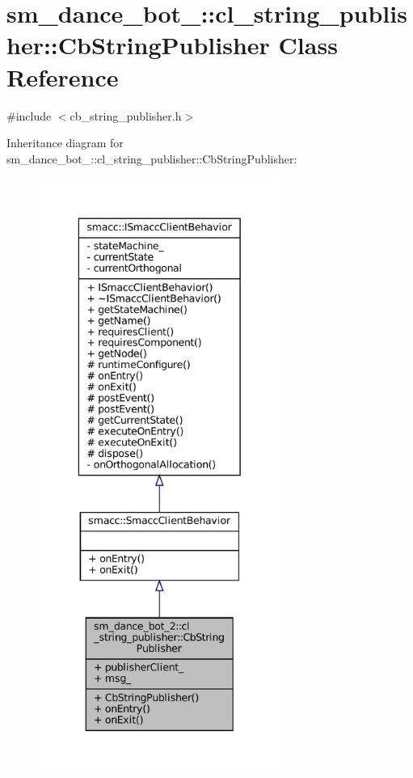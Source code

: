\hypertarget{classsm__dance__bot__2_1_1cl__string__publisher_1_1CbStringPublisher}{}\section{sm\+\_\+dance\+\_\+bot\+\_\+:\+:cl\+\_\+string\+\_\+publisher\+:\+:Cb\+String\+Publisher Class Reference}
\label{classsm__dance__bot__2_1_1cl__string__publisher_1_1CbStringPublisher}


{\ttfamily \#include $<$cb\+\_\+string\+\_\+publisher.\+h$>$}



Inheritance diagram for sm\+\_\+dance\+\_\+bot\+\_\+:\+:cl\+\_\+string\+\_\+publisher\+:\+:Cb\+String\+Publisher\+:
\nopagebreak
\begin{figure}[H]
\begin{center}
\leavevmode
\includegraphics[height=550pt]{classsm__dance__bot__2_1_1cl__string__publisher_1_1CbStringPublisher__inherit__graph}
\end{center}
\end{figure}


